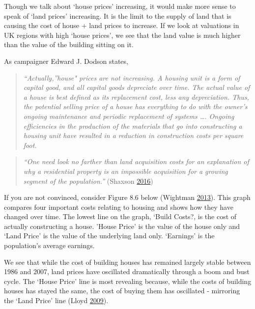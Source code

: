\documentclass[]{tufte-handout}
\begin{document}
Though we talk about `house prices' increasing, it would make more sense
to speak of `land prices' increasing. It is the limit to the supply of
land that is causing the cost of house + land prices to increase. If we
look at valuations in UK regions with high `house prices', we see that
the land value is much higher than the value of the building sitting on
it.

As campaigner Edward J. Dodson states,

\begin{quote}
\emph{``Actually,''house" prices are not increasing. A housing unit is a
form of capital good, and all capital goods depreciate over time. The
actual value of a house is best defined as its replacement cost, less
any depreciation. Thus, the potential selling price of a house has
everything to do with the owner's ongoing maintenance and periodic
replacement of systems \ldots{}. Ongoing efficiencies in the production
of the materials that go into constructing a housing unit have resulted
in a reduction in construction costs per square foot.}
\end{quote}

\begin{quote}
\emph{``One need look no farther than land acquisition costs for an
explanation of why a residential property is an impossible acquisition
for a growing segment of the population.''} (Shaxson
\protect\hyperlink{ref-Shaxson2016}{2016})
\end{quote}

If you are not convinced, consider Figure 8.6 below (Wightman
\protect\hyperlink{ref-Wightman2013}{2013}). This graph compares four
important costs relating to housing and shows how they have changed over
time. The lowest line on the graph, `Build Costs?, is the cost of
actually constructing a house. 'House Price' is the value of the house
only and `Land Price' is the value of the underlying land only.
`Earnings' is the population's average earnings.

We see that while the cost of building houses has remained largely
stable between 1986 and 2007, land prices have oscillated dramatically
through a boom and bust cycle. The `House Price' line is most revealing
because, while the costs of building houses has stayed the same, the
cost of buying them has oscillated - mirroring the `Land Price' line
(Lloyd \protect\hyperlink{ref-Lloyd2009}{2009}).
\end{document}
